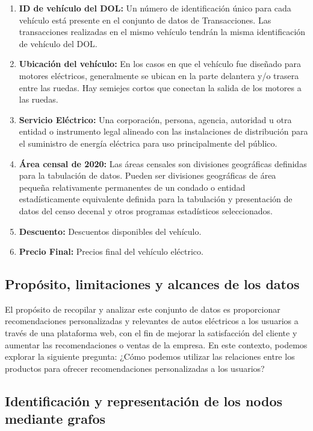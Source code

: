 \documentclass[12pt]{article}
\begin{document}
\begin{enumerate}
    \item \textbf{ID de vehículo del DOL:} Un número de identificación único para cada vehículo está presente en el conjunto de datos de Transacciones. Las transacciones realizadas en el mismo vehículo tendrán la misma identificación de vehículo del DOL.
    \item \textbf{Ubicación del vehículo:} En los casos en que el vehículo fue diseñado para motores eléctricos, generalmente se ubican en la parte delantera y/o trasera entre las ruedas. Hay semiejes cortos que conectan la salida de los motores a las ruedas.
    \item \textbf{Servicio Eléctrico:} Una corporación, persona, agencia, autoridad u otra entidad o instrumento legal alineado con las instalaciones de distribución para el suministro de energía eléctrica para uso principalmente del público.
    \item \textbf{Área censal de 2020:} Las áreas censales son divisiones geográficas definidas para la tabulación de datos. Pueden ser divisiones geográficas de área pequeña relativamente permanentes de un condado o entidad estadísticamente equivalente definida para la tabulación y presentación de datos del censo decenal y otros programas estadísticos seleccionados.
    \item \textbf{Descuento:} Descuentos disponibles del vehículo.
    \item \textbf{Precio Final:} Precios final del vehículo eléctrico.
\end{enumerate}

\subsection{Propósito, limitaciones y alcances de los datos}

El propósito de recopilar y analizar este conjunto de datos es proporcionar recomendaciones personalizadas y relevantes de autos eléctricos a los usuarios a través de una plataforma web, con el fin de mejorar la satisfacción del cliente y aumentar las recomendaciones o ventas de la empresa. En este contexto, podemos explorar la siguiente pregunta: ¿Cómo podemos utilizar las relaciones entre los productos para ofrecer recomendaciones personalizadas a los usuarios?

\subsection{Identificación y representación de los nodos mediante grafos}
\end{document}
